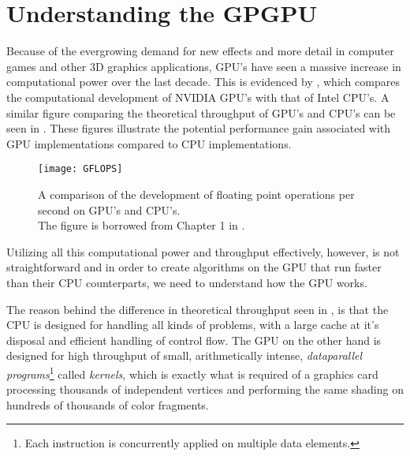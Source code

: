 \chapter{Understanding the GPGPU}\label{chp:GPGPU}





Because of the evergrowing demand for new effects and more detail in
computer games and other 3D graphics applications, GPU's have seen a
massive increase in computational power over the last decade. This is
evidenced by , which compares the computational
development of NVIDIA GPU's with that of Intel CPU's. A similar figure
comparing the theoretical throughput of GPU's and CPU's can be seen in
. These figures illustrate the potential performance
gain associated with GPU implementations compared to CPU
implementations.

\begin{figure}
  \centering
  \texttt{[image: GFLOPS]}
  
  \parbox{9cm}{\caption[Comparison of floating point operations per
      second on GPU's and CPU's.]{A comparison of the development of
      floating point operations per second on GPU's and CPU's. \\The
      figure is borrowed from Chapter 1 in
      .}\label{fig:gflops}}
\end{figure}


Utilizing all this computational power and throughput effectively,
however, is not straightforward and in order to create algorithms on
the GPU that run faster than their CPU counterparts, we need to
understand how the GPU works.

The reason behind the difference in theoretical throughput seen in
, is that the CPU is designed for handling all
kinds of problems, with a large cache at it's disposal and efficient
handling of control flow. The GPU on the other hand is designed for
high throughput of small, arithmetically intense, \textit{dataparallel
  programs}\footnote{Each instruction is concurrently applied on
  multiple data elements.} called \textit{kernels}, which is exactly
what is required of a graphics card processing thousands of
independent vertices and performing the same shading on hundreds of
thousands of color fragments.

